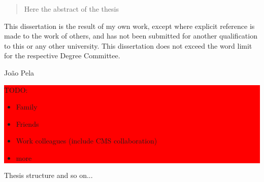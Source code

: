   


\begin{abstract}%
Here the abstract of the thesis
\end{abstract}


\begin{declaration}
  This dissertation is the result of my own work, except where explicit
  reference is made to the work of others, and has not been submitted
  for another qualification to this or any other university. This
  dissertation does not exceed the word limit for the respective Degree
  Committee.
  \vspace*{1cm}
  \begin{flushright}
    João Pela
  \end{flushright}
\end{declaration}


\begin{acknowledgements}


\colorbox{red}{
\begin{minipage}{\linewidth}
  
TODO:

\begin{itemize}
  \item Family
  \item Friends
  \item Work colleagues (include CMS collaboration)
  \item more
\end{itemize}

\end{minipage}
}
\end{acknowledgements}



\begin{preface}
Thesis structure and so on...
\end{preface}

\dedication{To my grand mother}


\tableofcontents

 
